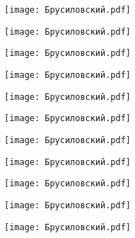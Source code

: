 \documentclass[main.tex]{subfiles}
\begin{document}
\begin{center}
\texttt{[image: Брусиловский.pdf]}
\end{center}



\begin{center}
\texttt{[image: Брусиловский.pdf]}
\end{center}



\begin{center}
\texttt{[image: Брусиловский.pdf]}
\end{center}



\begin{center}
\texttt{[image: Брусиловский.pdf]}
\end{center}



\begin{center}
\texttt{[image: Брусиловский.pdf]}
\end{center}



\begin{center}
\texttt{[image: Брусиловский.pdf]}
\end{center}



\begin{center}
\texttt{[image: Брусиловский.pdf]}
\end{center}



\begin{center}
\texttt{[image: Брусиловский.pdf]}
\end{center}



\begin{center}
\texttt{[image: Брусиловский.pdf]}
\end{center}



\begin{center}
\texttt{[image: Брусиловский.pdf]}
\end{center}



\begin{center}
\texttt{[image: Брусиловский.pdf]}
\end{center}
\end{document}
